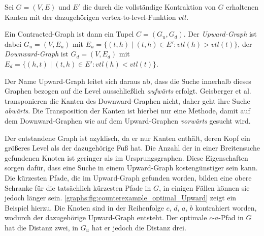 \begin{definition}
  Sei $G = (V, E)$ und $E'$ die durch die vollständige Kontraktion von $G$ erhaltenen Kanten mit der dazugehörigen vertex-to-level-Funktion ${vtl}$.

  Ein Contracted-Graph ist dann ein Tupel $C = (G_u, G_d)$. Der \emph{Upward-Graph} ist dabei $G_u = (V, E_u)$ mit $E_u = \{ (t, h) \mid (t, h) \in E' \colon {vtl}(h) > {vtl}(t) \}$, der \emph{Downward-Graph} ist $G_d = (V, E_d)$ mit $E_d = \{ (h, t) \mid (t, h) \in E' \colon {vtl}(h) < {vtl}(t) \}$.
\end{definition}

Der Name Upward-Graph leitet sich daraus ab, dass die Suche innerhalb dieses Graphen bezogen auf die Level ausschließlich \emph{aufwärts} erfolgt.
Geisberger et al. \cite{geisberger2008contraction} transponieren die Kanten des Downward-Graphen nicht, daher geht ihre Suche \emph{abwärts}.
Die Transposition der Kanten ist hierbei nur eine Methode, damit auf dem Downward-Graphen wie auf dem Upward-Graphen \emph{vorwärts} gesucht wird.

Der entstandene Graph ist azyklisch, da er nur Kanten enthält, deren Kopf ein größeres Level als der dazugehörige Fuß hat.
Die Anzahl der in einer Breitensuche gefundenen Knoten ist geringer als im Ursprungsgraphen.
Diese Eigenschaften sorgen dafür, dass eine Suche in einem Upward-Graph kostengünstiger sein kann.
Die kürzesten Pfade, die im Upward-Graph gefunden worden, bilden eine obere Schranke für die tatsächlich kürzesten Pfade in $G$, in einigen Fällen können sie jedoch länger sein.
\autoref{graphs:fig:counterexample_optimal_Upward} zeigt ein Beispiel hierzu.
Die Knoten sind in der Reihenfolge $c$, $d$, $a$, $b$ kontrahiert worden, wodurch der dazugehörige Upward-Graph entsteht.
Der optimale $c$-$a$-Pfad in $G$ hat die Distanz zwei, in $G_u$ hat er jedoch die Distanz drei.


